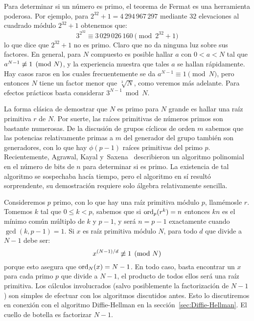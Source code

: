   Para determinar si un número es primo,
  el teorema de Fermat%
  es una herramienta poderosa.
  Por ejemplo,
  para \(2^{32} + 1 = 4\,294\,967\,297\)
  mediante \(32\) elevaciones al cuadrado módulo \(2^{32} + 1\)%
  obtenemos que:
  \begin{equation*}
    3^{2^{32}} \equiv 3\,029\,026\,160 \pmod{2^{32} + 1}
  \end{equation*}
  lo que dice que \(2^{32} + 1\) no es primo.
  Claro que no da ninguna luz sobre sus factores.
  En general,
  para \(N\) compuesto es posible hallar \(a\)
  con \(0 < a < N\)
  tal que \(a^{N - 1} \centernot\equiv 1 \pmod{N}\),
  y la experiencia muestra que tales \(a\) se hallan rápidamente.
  Hay casos raros en los cuales frecuentemente se da
  \(a^{N - 1} \equiv 1 \pmod{N}\),
  pero entonces \(N\) tiene un factor menor que \(\sqrt[3]{N}\),
  como veremos más adelante.
  Para efectos prácticos basta considerar \(3^{N - 1} \bmod N\).

  La forma clásica de demostrar que \(N\) es primo
  para	\(N\) grande
  es hallar una raíz primitiva \(r\) de \(N\).%
  Por suerte,
  las raíces primitivas de números primos son bastante numerosas.
  De la discusión de grupos cíclicos de orden \(m\)
  sabemos que las potencias relativamente primas a \(m\)
  del generador del grupo
  también son generadores,
  con lo que hay \(\phi(p - 1)\) raíces primitivas del primo \(p\).
  Recientemente,
  Agrawal, Kayal y~Saxena~\cite{agrawal04:_primes_in_P}%
  describieron un algoritmo polinomial en el número de bits de \(n\)
  para determinar si es primo.
  La existencia de tal algoritmo se sospechaba hacía tiempo,
  pero el algoritmo en sí resultó sorprendente,
  su demostración requiere solo álgebra relativamente sencilla.

  Consideremos \(p\) primo,
  con lo que hay una raíz primitiva módulo \(p\),
  llamémosle \(r\).
  Tomemos \(k\) tal que \(0 \le k < p\),
  sabemos que si \(\operatorname{ord}_p(r^k) = n\)
  entonces \(k n\) es el mínimo común múltiplo de \(k\) y \(p - 1\),
  y será \(n = p - 1\) exactamente cuando \(\gcd(k, p - 1) = 1\).
  Si \(x\) es raíz primitiva módulo \(N\),
  para todo \(d\) que divide a \(N - 1\) debe ser:
  \begin{equation*}
    x^{(N - 1) / d} \centernot\equiv 1 \pmod{N}
  \end{equation*}
  porque esto asegura que \(\operatorname{ord}_N(x) = N - 1\).
  En todo caso,
  basta encontrar un \(x\)
  para cada primo \(p\) que divide a \(N - 1\),
  el producto de todos ellos será una raíz primitiva.
  Los cálculos involucrados
  (salvo posiblemente la factorización de \(N - 1\))
  son simples de efectuar con los algoritmos discutidos antes.
  Esto lo discutiremos en conexión con el algoritmo Diffie-Hellman%
  en la sección~\ref{sec:Diffie-Hellman}.
  El cuello de botella es factorizar \(N - 1\).

